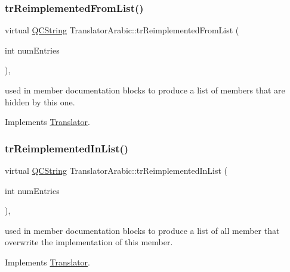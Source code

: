 \subsubsection{\texorpdfstring{trReimplementedFromList()}{trReimplementedFromList()}}
{\footnotesize\ttfamily virtual \mbox{\hyperlink{class_q_c_string}{Q\+C\+String}} Translator\+Arabic\+::tr\+Reimplemented\+From\+List (\begin{DoxyParamCaption}\item[{int}]{num\+Entries }\end{DoxyParamCaption})\hspace{0.3cm}{\ttfamily [inline]}, {\ttfamily [virtual]}}

used in member documentation blocks to produce a list of members that are hidden by this one. 

Implements \mbox{\hyperlink{class_translator}{Translator}}.

\mbox{\label{class_translator_arabic_ab3ae400f56c2865c3c7342f02602035d}} 
\subsubsection{\texorpdfstring{trReimplementedInList()}{trReimplementedInList()}}
{\footnotesize\ttfamily virtual \mbox{\hyperlink{class_q_c_string}{Q\+C\+String}} Translator\+Arabic\+::tr\+Reimplemented\+In\+List (\begin{DoxyParamCaption}\item[{int}]{num\+Entries }\end{DoxyParamCaption})\hspace{0.3cm}{\ttfamily [inline]}, {\ttfamily [virtual]}}

used in member documentation blocks to produce a list of all member that overwrite the implementation of this member. 

Implements \mbox{\hyperlink{class_translator}{Translator}}.

\mbox{\label{class_translator_arabic_a0f490a6c4b322b59e8d6c22b1a434b36}} 
